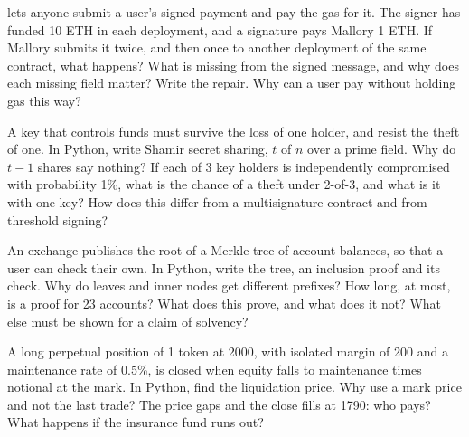 \begin{question}\label{iq:iv3:smart-contracts-and-crypto-engineering:24}
 lets anyone submit a user's signed payment and pay the gas for it. The signer has funded 10 ETH in each deployment, and a signature pays Mallory 1 ETH. If Mallory submits it twice, and then once to another deployment of the same contract, what happens? What is missing from the signed message, and why does each missing field matter? Write the repair. Why can a user pay without holding gas this way?
\label{lst:iv3:cr:relay}
\end{question}

\begin{question}\label{iq:iv3:smart-contracts-and-crypto-engineering:25}
A key that controls funds must survive the loss of one holder, and resist the theft of one. In Python, write Shamir secret sharing, $t$ of $n$ over a prime field. Why do $t - 1$ shares say nothing? If each of 3 key holders is independently compromised with probability 1\%, what is the chance of a theft under 2-of-3, and what is it with one key? How does this differ from a multisignature contract and from threshold signing?
\end{question}

\begin{question}\label{iq:iv3:smart-contracts-and-crypto-engineering:26}
An exchange publishes the root of a Merkle tree of account balances, so that a user can check their own. In Python, write the tree, an inclusion proof and its check. Why do leaves and inner nodes get different prefixes? How long, at most, is a proof for 23 accounts? What does this prove, and what does it not? What else must be shown for a claim of solvency?
\end{question}

\begin{question}\label{iq:iv3:smart-contracts-and-crypto-engineering:27}
A long perpetual position of 1 token at 2000, with isolated margin of 200 and a maintenance rate of 0.5\%, is closed when equity falls to maintenance times notional at the mark. In Python, find the liquidation price. Why use a mark price and not the last trade? The price gaps and the close fills at 1790: who pays? What happens if the insurance fund runs out?
\end{question}

